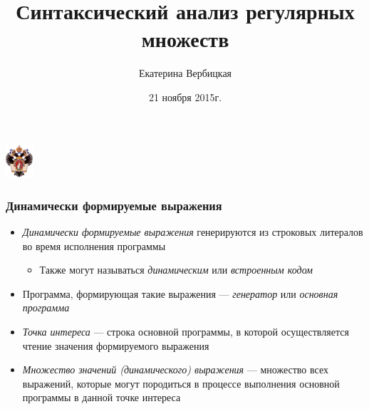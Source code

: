 \documentclass{beamer}
\title[]{Синтаксический анализ регулярных множеств}
\institute[]{
Семинар научно-исследовательских лабораторий JetBrains }
\author[Екатерина Вербицкая]{Екатерина Вербицкая}
\date{21 ноября 2015г.}
\begin{document}
{

\begin{frame}
  \begin{center}
  {\includegraphics[width=1cm]{SPbGU_Logo.png}}
  \end{center}
  \titlepage
\end{frame}
}

\begin{frame}[fragile]
  \transwipe[direction=90]
  \frametitle{Динамически формируемые выражения}
  \begin{itemize}
    \item \emph{Динамически формируемые выражения} генерируются из строковых литералов во время исполнения программы
    \begin{itemize}
      \item Также могут называться \emph{динамическим} или \emph{встроенным кодом}
    \end{itemize}
  \end{itemize}

  \begin{itemize}
    \item Программа, формирующая такие выражения --- \emph{генератор} или \emph{основная программа}
  \end{itemize}

  \begin{itemize}
    \item \emph{Точка интереса} --- строка основной программы, в которой осуществляется чтение значения формируемого выражения
  \end{itemize}

  \begin{itemize}
    \item \emph{Множество значений (динамического) выражения} --- множество всех выражений, 
которые могут породиться в процессе выполнения основной программы в данной точке интереса
  \end{itemize}

\end{frame}
\end{document}
